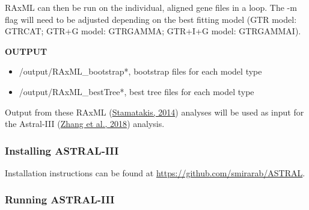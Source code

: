 \documentclass[
  12pt,
]{article}
\newenvironment{Shaded}{\begin{snugshade}}{\end{snugshade}}
\newcommand{\AttributeTok}[1]{\textcolor[rgb]{0.13,0.29,0.53}{#1}}
\newcommand{\BuiltInTok}[1]{#1}
\newcommand{\CommentTok}[1]{\textcolor[rgb]{0.56,0.35,0.01}{\textit{#1}}}
\newcommand{\ControlFlowTok}[1]{\textcolor[rgb]{0.13,0.29,0.53}{\textbf{#1}}}
\newcommand{\ExtensionTok}[1]{#1}
\newcommand{\FunctionTok}[1]{\textcolor[rgb]{0.13,0.29,0.53}{\textbf{#1}}}
\newcommand{\KeywordTok}[1]{\textcolor[rgb]{0.13,0.29,0.53}{\textbf{#1}}}
\newcommand{\NormalTok}[1]{#1}
\newcommand{\OperatorTok}[1]{\textcolor[rgb]{0.81,0.36,0.00}{\textbf{#1}}}
\newcommand{\PreprocessorTok}[1]{\textcolor[rgb]{0.56,0.35,0.01}{\textit{#1}}}
\newcommand{\StringTok}[1]{\textcolor[rgb]{0.31,0.60,0.02}{#1}}
\newcommand{\VariableTok}[1]{\textcolor[rgb]{0.00,0.00,0.00}{#1}}
\providecommand{\tightlist}{%
  \setlength{\itemsep}{0pt}\setlength{\parskip}{0pt}}
\begin{document}
RAxML can then be run on the individual, aligned gene files in a loop. The -m flag will need to be adjusted depending on the best fitting model (GTR model: GTRCAT; GTR+G model: GTRGAMMA; GTR+I+G model: GTRGAMMAI).

\begin{Shaded}
\end{Shaded}

\textbf{OUTPUT}

\begin{itemize}
\tightlist
\item
  /output/RAxML\_bootstrap*, bootstrap files for each model type
\item
  /output/RAxML\_bestTree*, best tree files for each model type
\end{itemize}

Output from these RAxML (\protect\hyperlink{ref-Stamatakis2014}{Stamatakis, 2014}) analyses will be used as input for the Astral-III (\protect\hyperlink{ref-Zhang2018}{Zhang et al., 2018}) analysis.

\hypertarget{installing-astral-iii}{%
\subsubsection{Installing ASTRAL-III}\label{installing-astral-iii}}

Installation instructions can be found at \url{https://github.com/smirarab/ASTRAL}.

\hypertarget{running-astral-iii}{%
\subsubsection{Running ASTRAL-III}\label{running-astral-iii}}
\end{document}
